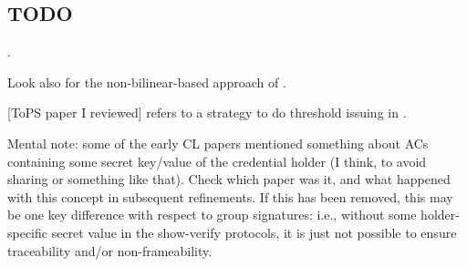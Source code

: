 \subsection{TODO}

\cite{cl04,ckl+15}.

Look also for the non-bilinear-based approach of \cite{cl04}.

[ToPS paper I reviewed] refers to a strategy to do threshold issuing in \cite{bbh06}.

Mental note: some of the early CL papers mentioned something about ACs
containing some secret key/value of the credential holder (I think, to avoid
sharing or something like that). Check which paper was it, and what happened
with this concept in subsequent refinements. If this has been removed, this may
be one key difference with respect to group signatures: i.e., without some
holder-specific secret value in the show-verify protocols, it is just not
possible to ensure traceability and/or non-frameability.

